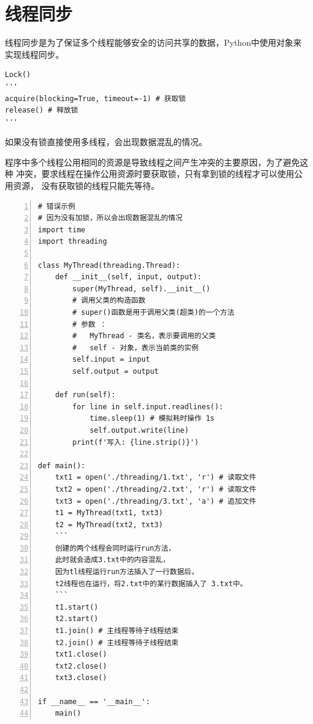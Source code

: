 \section{线程同步}
\label{sec:线程同步}
线程同步是为了保证多个线程能够安全的访问共享的数据，Python中使用对象来实现线程同步。

\begin{lstlisting}[style=demostyle,numbers=none]
Lock()
'''
acquire(blocking=True, timeout=-1) # 获取锁
release() # 释放锁
'''
\end{lstlisting}

如果没有锁直接使用多线程，会出现数据混乱的情况。

程序中多个线程公用相同的资源是导致线程之间产生冲突的主要原因，为了避免这种
冲突，要求线程在操作公用资源时要获取锁，只有拿到锁的线程才可以使用公用资源，
没有获取锁的线程只能先等待。

\begin{lstlisting}[style=pythonstyle,numbers=left]
# 错误示例
# 因为没有加锁，所以会出现数据混乱的情况
import time
import threading

class MyThread(threading.Thread):
    def __init__(self, input, output):
        super(MyThread, self).__init__() 
        # 调用父类的构造函数
        # super()函数是用于调用父类(超类)的一个方法
        # 参数 ：
        #   MyThread - 类名，表示要调用的父类
        #   self - 对象，表示当前类的实例
        self.input = input
        self.output = output
    
    def run(self):
        for line in self.input.readlines():
            time.sleep(1) # 模拟耗时操作 1s
            self.output.write(line)
        print(f'写入: {line.strip()}')

def main():
    txt1 = open('./threading/1.txt', 'r') # 读取文件
    txt2 = open('./threading/2.txt', 'r') # 读取文件
    txt3 = open('./threading/3.txt', 'a') # 追加文件
    t1 = MyThread(txt1, txt3)
    t2 = MyThread(txt2, txt3)
    ``` 
    创建的两个线程会同时运行run方法，
    此时就会造成3.txt中的内容混乱，
    因为tl线程运行run方法插入了一行数据后，
    t2线程也在运行，将2.txt中的某行数据插入了 3.txt中。
    ```
    t1.start()
    t2.start()
    t1.join() # 主线程等待子线程结束
    t2.join() # 主线程等待子线程结束
    txt1.close()
    txt2.close()
    txt3.close()

if __name__ == '__main__':
    main()
\end{lstlisting}

